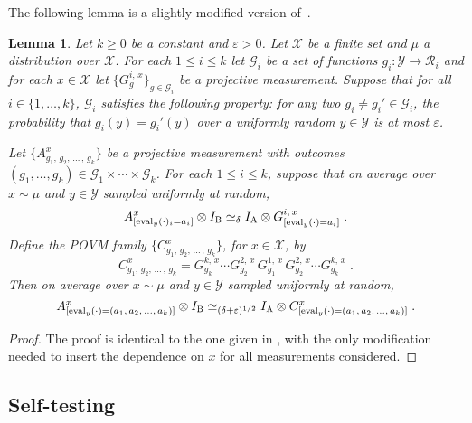 \documentclass[11pt]{article}
\newtheorem{lemma}[theorem]{Lemma}
\theoremstyle{definition}
\newcommand{\mG}{\ensuremath{\mathcal{G}}}
\newcommand{\mR}{\ensuremath{\mathcal{R}}}
\newcommand{\mX}{\ensuremath{\mathcal{X}}}
\newcommand{\mY}{\ensuremath{\mathcal{Y}}}
\newcommand{\eps}{\varepsilon}
\newcommand{\labelstyle}[1]{\ensuremath{\textsc{#1}}\xspace}
\newcommand{\alice}{\labelstyle{A}}
\newcommand{\bob}{\labelstyle{B}}
\newcommand{\abc}[1][\delta]{\otimes I_\bob \simeq_{#1} I_\alice \otimes}
\newcommand{\eval}{\mathrm{eval}}
\begin{document}
The following lemma is a slightly modified version of~\cite[Fact~4.34]{NW19}.

\begin{lemma}\label{lem:ld-sandwich}
  Let $k \geq 0$ be a constant and $\eps>0$.
  Let $\mX$ be a finite set and $\mu$ a distribution over  $\mX$.
  For each $1 \leq i \leq k$ let $\mG_i$ be a set of functions $g_i : \mY
  \rightarrow \mR_i$ and for each $x \in \mX$ let $\{G^{i,\, x}_g\}_{g\in \mG_i}$ be a
  projective measurement.
  Suppose that for all $i\in \{1,\ldots,k\}$, $\mG_i$ satisfies the following property: for any two
 $g_i \neq g_i' \in \mG_i$, the probability that $g_i(y) = g_i'(y)$ over
  a uniformly random $y \in \mY$ is at most $\eps$.

  Let $\bigl\{ A^{x}_{g_1,\, g_2,\, \ldots\,,\, g_k} \bigr\}$ be a projective
  measurement with outcomes $(g_1,\ldots,g_k) \in \mG_1\times\cdots\times
  \mG_k$.
  For each $1 \leq i \leq k$, suppose that on average over $x \sim \mu$ and
  $y\in \mY$ sampled uniformly at random,
  \begin{equation}\label{eq:ld-sandwich-1}
    A^{x}_{[\eval_y(\cdot)_i = a_i]} \abc G^{i,\, x}_{[\eval_y(\cdot)=a_i]}\;.
  \end{equation}
  Define the POVM family $\{C^x_{g_1,\, g_2,\, \ldots\,,\, g_k}\}$, for $x\in \mX$, by
  \begin{equation*}
    C^x_{g_1,\, g_2,\, \ldots\,,\, g_k} = G^{k,\, x}_{g_k} \cdots
    G^{2,\, x}_{g_2} \, G^{1,\, x}_{g_1} \, G^{2,\, x}_{g_2} \cdots
    G^{k,\, x}_{g_k}\;.
  \end{equation*}
  Then on average over $x\sim \mu$ and $y\in \mY$ sampled uniformly at random,
  \begin{equation}\label{eq:ld-sandwich-2}
    A^x_{[\eval_y(\cdot) = (a_1,\, a_2,\, \ldots,\, a_k)]} \abc[(\delta+\eps)^{1/2}]
    C^x_{[\eval_y(\cdot) = (a_1,\, a_2,\, \ldots,\, a_k)]}\;.
\end{equation}
\end{lemma}

\begin{proof}
  The proof is identical to the one given in \cite[Fact~4.34]{NW19}, with the
  only modification needed to insert the dependence on $x$ for all measurements
  considered.
\end{proof}

\subsection{Self-testing}
\end{document}

